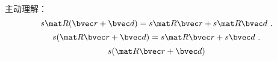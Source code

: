 
主动理解：
\begin{equation}
s\mat R (\bvec r + \bvec d) = s\mat R\bvec r + s\mat R\bvec d~.
\end{equation}
\begin{equation}
s(\mat R\bvec r + \bvec d) = s\mat R\bvec r + s\bvec d~.
\end{equation}
\begin{equation}
s(\mat R\bvec r + \bvec d)
\end{equation}
